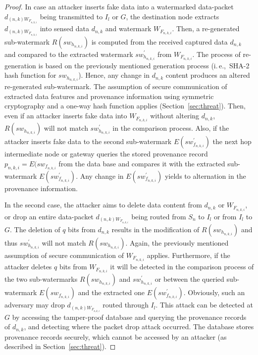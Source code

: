 \documentclass{llncs}
\newcommand{\ie}{i.\,e.,~}
\begin{document}
\begin{proof}
In case an attacker inserts fake data into a watermarked data-packet $d_{(n,k)W_{F_{n,k,i}}}$ being transmitted to $I_l$ or $G$, the destination node extracts $d_{(n,k)W_{F_{n,k,i}}}$ into sensed data $d_{n,k}$ and watermark $W_{F_{n,k,i}}$. Then, a re-generated sub-watermark $R(sw_{h_{n,k,i}})$ is computed from the received captured data $d_{n,k}$ and compared to the extracted watermark $sw^{'}_{h_{n,k,i}}$ from $W_{F_{n,k,i}}$. The process of re-generation is based on the previously mentioned generation process (\ie SHA-2 hash function for $sw_{h_{n,k,i}}$). Hence, any change in $d_{n,k}$ content produces an altered re-generated sub-watermark. The assumption of secure communication of extracted data features and provenance information using symmetric cryptography and a one-way hash function applies (Section~\ref{sec:threat}). Then, even if an attacker inserts fake data into $W_{F_{n,k,i}}$ without altering $d_{n,k}$, $R(sw_{h_{n,k,i}})$ will not match $sw^{'}_{h_{n,k,i}}$ in the comparison process. Also, if the attacker inserts fake data to the second sub-watermark $E(sw^{'}_{f_{n,k,i}})$ the next hop intermediate node or gateway queries the stored provenance record $p_{n,k,i} = E(sw_{f_{n,k,i}}$ from the data base and compares it with the extracted sub-watermark $E(sw^{'}_{f_{n,k,i}})$. Any change in $E(sw^{'}_{f_{n,k,i}})$ yields to alternation in the provenance information.

In the second case, the attacker aims to delete data content from $d_{n,k}$ or $W_{F_{n,k,i}}$, or drop an entire data-packet $d_{(n,k)W_{F_{n,k,i}}}$ being routed from $S_n$ to $I_l$ or from $I_l$ to $G$. The deletion of $q$ bits from $d_{n,k}$ results in the modification of $R(sw_{h_{n,k,i}})$ and thus $sw^{'}_{h_{n,k,i}}$ will not match $R(sw_{h_{n,k,i}})$. Again, the previously mentioned assumption of secure communication of $W_{F_{n,k,i}}$ applies. Furthermore, if the attacker deletes $q$ bits from $W_{F_{n,k,i}}$ it will be detected in the comparison process of the two sub-watermarks $R(sw_{h_{n,k,i}})$ and $sw^{'}_{h_{n,k,i}}$ or between the queried sub-watermark $E(sw_{f_{n,k,i}})$ and the extracted one $E(sw^{'}_{f_{n,k,i}})$. Obviously, such an adversary may drop $d_{(n,k)W_{F_{n,k,i}}}$ routed through $I_l$. This attack can be detected at $G$ by accessing the tamper-proof database and querying the provenance records of $d_{n,k}$, and detecting where the packet drop attack occurred. The database stores provenance records securely, which cannot be accessed by an attacker (as described in Section~\ref{sec:threat}).  
\end{proof}
\end{document}
